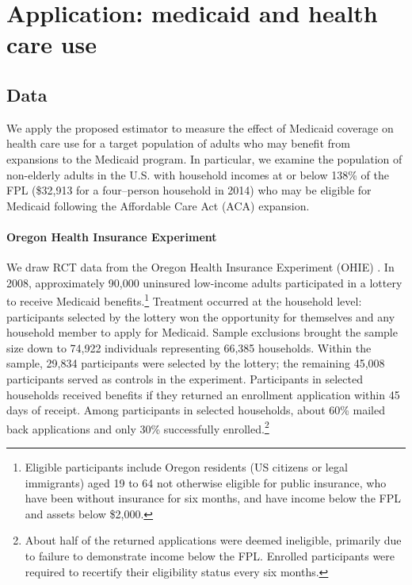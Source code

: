 \documentclass[12pt]{article}
\begin{document}

\section{Application: medicaid and health care use}
\subsection{Data} \label{data}

We apply the proposed estimator to measure the effect of Medicaid coverage on health care use for a target population of adults who may benefit from expansions to the Medicaid program. In particular, we examine the population of non-elderly adults in the U.S. with household incomes at or below 138\% of the FPL (\$32,913 for a four--person household in 2014) who may be eligible for Medicaid following the Affordable Care Act (ACA) expansion.

\paragraph{Oregon Health Insurance Experiment}

We draw RCT data from the Oregon Health Insurance Experiment (OHIE) \citep{finkelstein2012,baicker2013,baicker2014,Taubman}.  In 2008, approximately 90,000 uninsured low-income adults participated in a lottery to receive Medicaid benefits.\footnote{Eligible participants include Oregon residents (US citizens or legal immigrants) aged 19 to 64 not otherwise eligible for public insurance, who have been without insurance for six months, and have income below the FPL and assets below \$2,000.} Treatment occurred at the household level: participants selected by the lottery won the opportunity for themselves and any household member to apply for Medicaid. Sample exclusions brought the sample size down to 74,922 individuals representing 66,385 households.  Within the sample, 29,834 participants were selected by the lottery; the remaining 45,008 participants served as controls in the experiment.  Participants in selected households received benefits if they returned an enrollment application within 45 days of receipt. Among participants in selected households, about 60\% mailed back applications and only 30\% successfully enrolled.\footnote{About half of the returned applications were deemed ineligible, primarily due to failure to demonstrate income below the FPL. Enrolled participants were required to recertify their eligibility status every six months.}  
\end{document}
